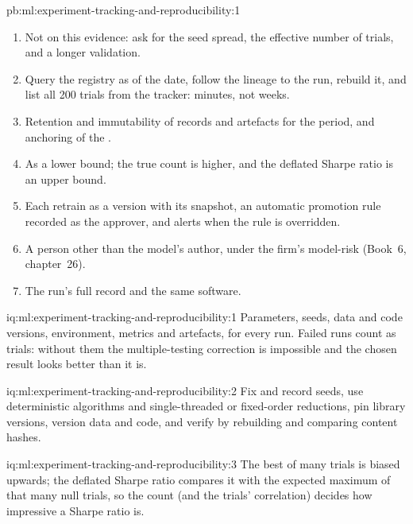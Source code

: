 \begin{solution}{pb:ml:experiment-tracking-and-reproducibility:1}
\begin{enumerate}[resume]
deflated Sharpe ratio of 0.15; reproduction from the registry is exact, and it fails with any one of parameters, seed, data
snapshot or code version missing.
\item Not on this evidence: ask for the seed spread, the effective number of trials, and a longer validation.
\item Query the registry as of the date, follow the lineage to the run, rebuild it, and list all 200 trials from the tracker:
minutes, not weeks.
\item Retention and immutability of records and artefacts for the period, and anchoring of the .
\item As a lower bound; the true count is higher, and the deflated Sharpe ratio is an upper bound.
\item Each retrain as a version with its snapshot, an automatic promotion rule recorded as the approver, and alerts when the
rule is overridden.
\item A person other than the model's author, under the firm's model-risk  (Book~6, chapter~26).
\item The run's full record and the same software.
\end{enumerate}
\end{solution}

\begin{solution}{iq:ml:experiment-tracking-and-reproducibility:1}
Parameters, seeds, data and code versions, environment, metrics and artefacts, for every run. Failed runs count as trials: without
them the multiple-testing correction is impossible and the chosen result looks better than it is.
\end{solution}

\begin{solution}{iq:ml:experiment-tracking-and-reproducibility:2}
Fix and record seeds, use deterministic algorithms and single-threaded or fixed-order reductions, pin library versions, version
data and code, and verify by rebuilding and comparing content hashes.
\end{solution}

\begin{solution}{iq:ml:experiment-tracking-and-reproducibility:3}
The best of many trials is biased upwards; the deflated Sharpe ratio compares it with the expected maximum of that many null
trials, so the count (and the trials' correlation) decides how impressive a Sharpe ratio is.
\end{solution}

